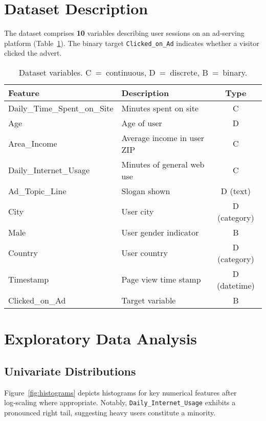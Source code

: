 \documentclass[12pt]{article}
\begin{document}
\section{Dataset Description}\label{sec:data}
The dataset comprises \textbf{10} variables describing user sessions on an ad‑serving platform (Table~\ref{tab:features}). The binary target \texttt{Clicked\_on\_Ad} indicates whether a visitor clicked the advert.

\begin{table}[H]
\centering
\caption{Dataset variables. C = continuous, D = discrete, B = binary.}
\label{tab:features}
\begin{tabular}{@{}llc@{}}
\toprule
\textbf{Feature} & \textbf{Description} & \textbf{Type} \\
\midrule
Daily\_Time\_Spent\_on\_Site & Minutes spent on site & C \\
Age & Age of user & D \\
Area\_Income & Average income in user ZIP & C \\
Daily\_Internet\_Usage & Minutes of general web use & C \\
Ad\_Topic\_Line & Slogan shown & D (text) \\
City & User city & D (category) \\
Male & User gender indicator & B \\
Country & User country & D (category) \\
Timestamp & Page view time stamp & D (datetime) \\
Clicked\_on\_Ad & Target variable & B \\
\bottomrule
\end{tabular}
\end{table}

\section{Exploratory Data Analysis}\label{sec:eda}
\subsection{Univariate Distributions}
Figure~\ref{fig:histograms} depicts histograms for key numerical features after log‑scaling where appropriate. Notably, \texttt{Daily\_Internet\_Usage} exhibits a pronounced right tail, suggesting heavy users constitute a minority.
\end{document}
